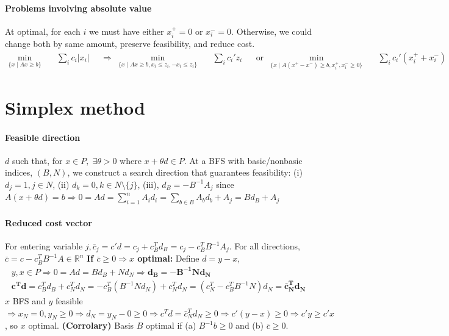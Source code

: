 \documentclass{article}
\newcommand{\abs}[1]{\lvert#1\rvert}
\begin{document}
\paragraph{Problems involving absolute value} At optimal, for each $i$ we must have either $x_i^+ = 0$ or $x_i^- = 0$. Otherwise, we could change both by same amount, preserve feasibility, and reduce cost.
{\footnotesize
\begin{align*}
    \min_{\{x \mid Ax \geq b\}}\quad& \sum_i c_i \abs{x_i}
    &&\Longrightarrow & 
    \min_{\{x \mid Ax \geq b, x_i \leq z_i, -x_i\leq z_i\}}\quad& \sum_i c_i'z_i
    &&\text{or} &
    \min_{\{x \mid A(x^+ - x^-) \geq b, x_i^+, x_i^- \geq 0\}}\quad& \sum_i c_i'(x_i^+ + x_i^-)
\end{align*}
}



\section{Simplex method}
\paragraph{Feasible direction} $d$ such that, for $x\in P,\; \exists \theta > 0$ where $x + \theta d \in P$. At a BFS with basic/nonbasic indices, $(B, N)$, we construct a search direction that guarantees feasibility: (i) $d_j = 1, j \in N$, (ii) $d_k = 0, k\in N\setminus\{j\}$, (iii), $d_B = -B^{-1}A_j$ since $A(x + \theta d) = b \Rightarrow 0 = Ad = \sum_{i=1}^nA_id_i = \sum_{b\in B}A_bd_b + A_j = Bd_B + A_j$

\paragraph{Reduced cost vector} For entering variable $j, \bar c_j = c'd = c_j + c_B^Td_B = c_j - c_B^TB^{-1}A_j$. For all directions, $\bar c = c -c_B^TB^{-1}A \in \mathbb R^n$
\newline\textbf{If $\bar c \geq 0 \Rightarrow x$ optimal:} Define $d = y - x$, 
\begin{align*}
    y,x \in P \Longrightarrow 0 = Ad = Bd_B + Nd_N \Longrightarrow \mathbf{d_B = -B^{-1}Nd_N}\\
    \mathbf{c^Td} = c_B^Td_B + c_N^Td_N = -c_B^T(B^{-1}Nd_N) + c_N^Td_N = (c_N^T - c_B^TB^{-1}N)d_N = \mathbf{\bar c_N^Td_N}
\end{align*}
$x$ BFS and $y$ feasible $\Longrightarrow x_N = 0, y_N \geq 0\Longrightarrow  d_N = y_N - 0\geq 0 \Longrightarrow c^Td = \bar c_N^T d_N  \geq 0 \Longrightarrow c'(y-x) \geq 0 \Longrightarrow c'y \geq c'x$, so $x$ optimal. \textbf{(Corrolary)} Basis $B$ optimal if (a) $B^{-1}b \geq 0$ and (b) $\bar c \geq 0$.
\end{document}
